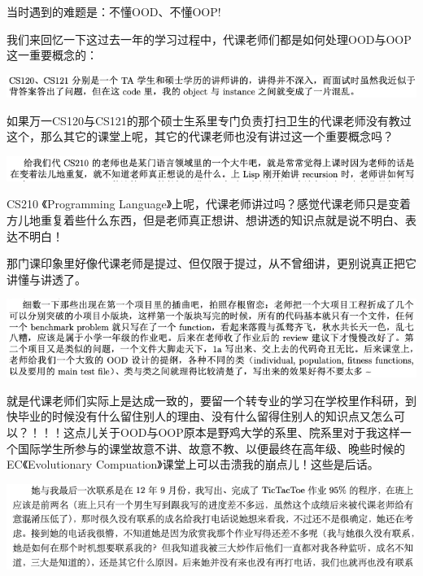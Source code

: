 \documentclass[9pt, b5paper]{article}
\begin{document}
当时遇到的难题是：不懂OOD、不懂OOP!

我们来回忆一下这过去一年的学习过程中，代课老师们都是如何处理OOD与OOP这一重要概念的：

\begin{center}
\includegraphics[width=.9\linewidth]{./pic/backups_plans_20210508_122814.png}
\end{center}

如果万一CS120与CS121的那个硕士生系里专门负责打扫卫生的代课老师没有教过这个，那么其它的课堂上呢，其它的代课老师也没有讲过这一个重要概念吗？

\begin{center}
\includegraphics[width=.9\linewidth]{./pic/backups_plans_20210508_123042.png}
\end{center}

CS210 《Programming Language》上呢，代课老师讲过吗？感觉代课老师只是变着方儿地重复着些什么东西，但是老师真正想讲、想讲透的知识点就是说不明白、表达不明白！

那门课印象里好像代课老师是提过、但仅限于提过，从不曾细讲，更别说真正把它讲懂与讲透了。 

\begin{center}
\includegraphics[width=.9\linewidth]{./pic/backups_plans_20210508_123559.png}
\end{center}

就是代课老师们实际上是达成一致的，要留一个转专业的学习在学校里作科研，到快毕业的时候没有什么留住别人的理由、没有什么留得住别人的知识点又怎么可以？！！！这点儿关于OOD与OOP原本是野鸡大学的系里、院系里对于我这样一个国际学生所参与的课堂故意不讲、故意不教、以便最终在高年级、晚些时候的EC《Evolutionary Compuation》课堂上可以击溃我的崩点儿！这些是后话。 

\begin{center}
\includegraphics[width=.9\linewidth]{./pic/backups_plans_20210508_125234.png}
\end{center}
\end{document}
